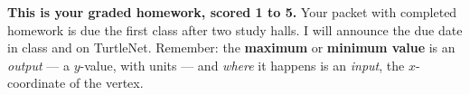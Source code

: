 \documentclass[12pt]{article}
\begin{document}

\boxguard[8]
\begin{remindbox}
\small
\textbf{This is your graded homework, scored 1 to 5.} Your packet with completed homework is due the first class
after two study halls. I will announce the due date in class and on TurtleNet. Remember: the
\textbf{maximum} or \textbf{minimum value} is an \emph{output} --- a $y$-value, with units --- and
\emph{where} it happens is an \emph{input}, the $x$-coordinate of the vertex.
\end{remindbox}

\vspace{0.08in}

\boxguard[14]
\end{document}
